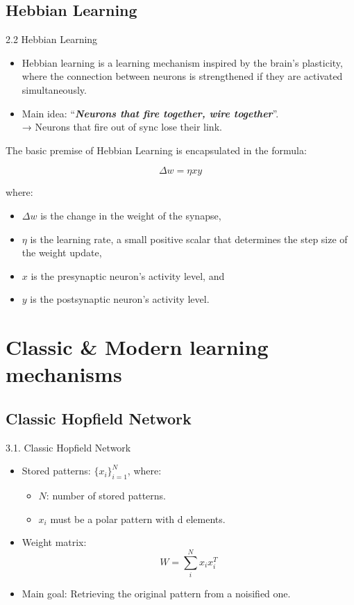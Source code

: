 \documentclass[11pt, aspectratio=169]{beamer}
\begin{document}
\subsection{Hebbian Learning}
\begin{frame}{2.2 Hebbian Learning \cite{albanese2024hebbian}}

\begin{itemize}
    \item Hebbian learning is a learning mechanism inspired by the brain's plasticity, where the connection between neurons is strengthened if they are activated simultaneously.

    \item Main idea: “\textbf{\textit{Neurons that fire together, wire together}}”.
\\→ Neurons that fire out of sync lose their link. 
\end{itemize}
The basic premise of Hebbian Learning is encapsulated in the formula:

$$\Delta w = \eta xy$$

where:

\begin{itemize}
 \item $\Delta w$ is the change in the weight of the synapse,
 \item $\eta$ is the learning rate, a small positive scalar that determines the step size of the weight update,
 \item $x$ is the presynaptic neuron's activity level, and
 \item $y$ is the postsynaptic neuron's activity level.
\end{itemize}

\end{frame}


\section{Classic \& Modern learning mechanisms}
\subsection{Classic Hopfield Network}
\begin{frame}{3.1. Classic Hopfield Network \cite{Hopfield:2007}}
    \begin{itemize}
        \item Stored patterns: $\{x_i\}^N_{i=1}$, where:
        \begin{itemize}
            \item $N$: number of stored patterns.
            \item $x_i$ must be a polar pattern with d elements.
        \end{itemize}

        \item Weight matrix: $$W = \sum_i^N x_i x_i^T$$

        \item Main goal: Retrieving the original pattern from a noisified one.

    \end{itemize}
\end{frame}
\end{document}
